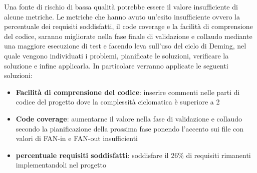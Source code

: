 Una fonte di rischio di bassa qualità potrebbe essere il valore insufficiente di alcune metriche. Le metriche che hanno avuto un'esito insufficiente ovvero la percentuale dei requisiti soddisfatti, il code coverage e la facilità di comprensione del codice, saranno migliorate
nella fase finale di validazione e collaudo mediante una maggiore esecuzione di test e facendo leva sull'uso del ciclo di Deming, nel quale
vengono individuati i problemi, pianificate le soluzioni, verificare la soluzione e infine applicarla.
In particolare  verranno applicate le seguenti soluzioni:
\begin{itemize}
    \item \textbf{Facilità di comprensione del codice}: inserire commenti nelle parti di codice del progetto dove la complessità ciclomatica è superiore a 2
    \item \textbf{Code coverage}: aumentarne il valore nella fase di validazione e collaudo secondo la pianificazione della prossima fase  ponendo l'accento sui file con valori di FAN-in e FAN-out insufficienti
    \item \textbf{percentuale requisiti soddisfatti}: soddisfare il 26\% di requisiti rimanenti implementandoli nel progetto
\end{itemize} 
